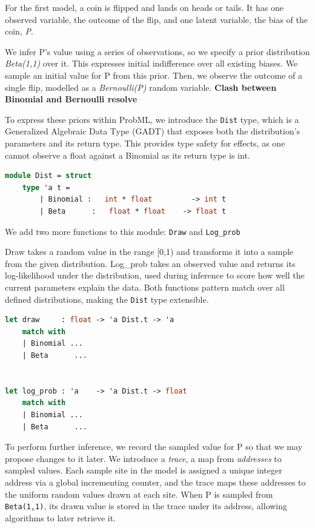 \documentclass[logo,bsc,singlespacing,parskip,online]{infthesis}
\begin{document}
For the first model, a coin is flipped and lands on heads or tails. It has one observed variable, the outcome of the flip, and one latent variable, the bias of the coin, \textit{P}. 

We infer P's value using a series of observations, so we specify a prior distribution \textit{Beta(1,1)} over it. This expresses initial indifference over all existing biases. We sample an initial value for P from this prior. Then, we observe the outcome of a single flip, modelled as a \textit{Bernoulli(P)} random variable. \textbf{Clash between Binomial and Bernoulli resolve}

To express these priors within ProbML, we introduce the \texttt{Dist} type, which is a Generalized Algebraic Data Type (GADT) that exposes both the distribution's parameters and its return type. This provides type safety for effects, as one cannot observe a float against a Binomial as its return type is int.

\begin{lstlisting}[language=OCaml]
module Dist = struct
    type 'a t =
        | Binomial :   int * float         -> int t
        | Beta      :   float * float    -> float t
\end{lstlisting}

We add two more functions to this module: \texttt{Draw} and \texttt{Log\_prob}

Draw takes a random value in the range [0,1) and transforms it into a sample from the given distribution. Log\_prob takes an observed value and returns its log-likelihood under the distribution, used during inference to score how well the current parameters explain the data. Both functions pattern match over all defined distributions, making the \texttt{Dist} type extensible.

\begin{lstlisting}[language=OCaml]
let draw     : float -> 'a Dist.t -> 'a
    match with
    | Binomial ...
    | Beta      ...

    
let log_prob : 'a    -> 'a Dist.t -> float
    match with
    | Binomial ...
    | Beta      ...


\end{lstlisting}

To perform further inference, we record the sampled value for P so that we may propose changes to it later. We introduce a \textit{trace}, a map from \textit{addresses} to sampled values. Each sample site in the model is assigned a unique integer address via a global incrementing counter, and the trace maps these addresses to the uniform random values drawn at each site. When P is sampled from \texttt{Beta(1,1)}, its drawn value is stored in the trace under its address, allowing algorithms to later retrieve it.
\end{document}
